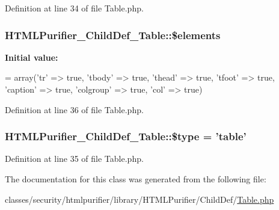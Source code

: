 Definition at line 34 of file Table.\+php.

\hypertarget{classHTMLPurifier__ChildDef__Table_a7ca799c4fcc31910a301c8c92486df35}{
\subsubsection[{\$elements}]{\setlength{\rightskip}{0pt plus 5cm}H\+T\+M\+L\+Purifier\+\_\+\+Child\+Def\+\_\+\+Table\+::\$elements}}\label{classHTMLPurifier__ChildDef__Table_a7ca799c4fcc31910a301c8c92486df35}
{\bfseries Initial value\+:}
\begin{DoxyCode}
= array(\textcolor{stringliteral}{'tr'} => \textcolor{keyword}{true}, \textcolor{stringliteral}{'tbody'} => \textcolor{keyword}{true}, \textcolor{stringliteral}{'thead'} => \textcolor{keyword}{true},
        \textcolor{stringliteral}{'tfoot'} => \textcolor{keyword}{true}, \textcolor{stringliteral}{'caption'} => \textcolor{keyword}{true}, \textcolor{stringliteral}{'colgroup'} => \textcolor{keyword}{true}, \textcolor{stringliteral}{'col'} => \textcolor{keyword}{true})
\end{DoxyCode}


Definition at line 36 of file Table.\+php.

\hypertarget{classHTMLPurifier__ChildDef__Table_aa47480c1b24895cb53cb7116dc1cbde4}{
\subsubsection[{\$type}]{\setlength{\rightskip}{0pt plus 5cm}H\+T\+M\+L\+Purifier\+\_\+\+Child\+Def\+\_\+\+Table\+::\$type = 'table'}}\label{classHTMLPurifier__ChildDef__Table_aa47480c1b24895cb53cb7116dc1cbde4}


Definition at line 35 of file Table.\+php.



The documentation for this class was generated from the following file\+:\begin{DoxyCompactItemize}
\item 
classes/security/htmlpurifier/library/\+H\+T\+M\+L\+Purifier/\+Child\+Def/\hyperlink{Table_8php}{Table.\+php}\end{DoxyCompactItemize}
